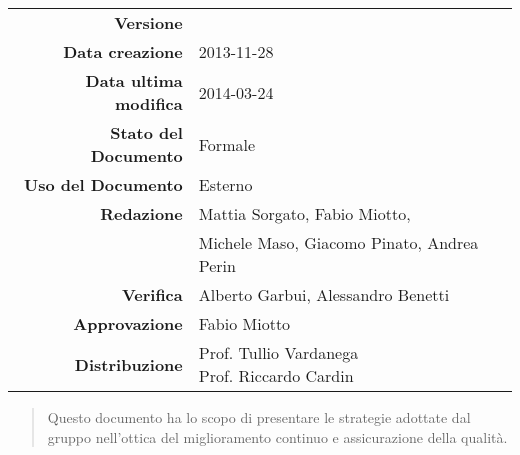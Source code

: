 

\newcommand{\Versione}{\versionePianoDiQualifica{}}	%
\newcommand{\Data}{2013-11-28}						%
\newcommand{\DataUltimaModifica}{2014-03-24}
\newcommand{\TipoDocumento}{Piano di Qualifica}		%




\begin{center}
\begin{tabular}{r|l}
\textbf{Versione} & \Versione{} \\
\textbf{Data creazione} & \Data{} \\
\textbf{Data ultima modifica} & \DataUltimaModifica{} \\
\textbf{Stato del Documento} & Formale \\		%
\textbf{Uso del Documento} & Esterno \\			%
\textbf{Redazione} & Mattia Sorgato, Fabio Miotto,\\			%
& Michele Maso, Giacomo Pinato, Andrea Perin\\
\textbf{Verifica} & Alberto Garbui, Alessandro Benetti\\%
\textbf{Approvazione} & Fabio Miotto\\				%
\textbf{Distribuzione} & \parbox[t]{4cm}{Prof. Tullio Vardanega \\ Prof. Riccardo Cardin \\ \Prop{} }\\
\end{tabular}
\end{center}

\vspace{0.05in}

\begin{abstract}
\begin{center}
Questo documento ha lo scopo di presentare le strategie adottate dal gruppo \NomeGruppo{} nell'ottica del miglioramento continuo e assicurazione della qualità.
\end{center}
\end{abstract}

